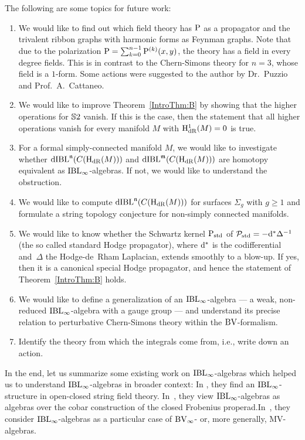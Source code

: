\documentclass[\MainFolder/Text.tex]{subfiles}
\begin{document}
The following are some topics for future work:

\begin{enumerate}[label=(\arabic*)]
\item We would like to find out which field theory has $\mathrm{P}$ as a propagator and the trivalent ribbon graphs with harmonic forms as Feynman graphs. Note that due to the polarization $\mathrm{P} = \sum_{k=0}^{n-1}\mathrm{P}^{(k)}(x,y)$, the theory has a field in every degree fields. This is in contrast to the Chern-Simons theory for $n=3$, whose field is a $1$-form. Some actions were suggested to the author by Dr.~Puzzio and Prof.~A.~Cattaneo.

\item We would like to improve Theorem~\ref{IntroThm:B} by showing that the higher operations for $\mathbb{S}{2}$ vanish. If this is the case,  then the statement that all higher operations vanish for every manifold $M$ with $\mathrm{H}_{\mathrm{dR}}^1(M)=0$ is true.
\item For a formal simply-connected manifold $M$, we would like to investigate whether $\mathrm{dIBL}^{\mathfrak{n}}(C(\mathrm{H}_{\mathrm{dR}}(M)))$ and $\mathrm{dIBL}^{\mathfrak{m}}(C(\mathrm{H}_{\mathrm{dR}}(M)))$ are homotopy equivalent as $\mathrm{IBL}_\infty$-algebras. If not, we would like to understand the obstruction. 
\item We would like to compute $\mathrm{dIBL}^{\mathfrak{n}}(C(\mathrm{H}_{\mathrm{dR}}(M)))$ for surfaces $\Sigma_g$ with $g\ge 1$ and formulate a string topology conjecture for non-simply connected manifolds. 
\item We would like to know whether the Schwartz kernel $\mathrm{P}_{\mathrm{std}}$ of $\mathcal{P}_{\mathrm{std}}=-\mathrm{d}^* \Delta^{-1}$ (the so called standard Hodge propagator), where $\mathrm{d}^*$ is the codifferential and~$\Delta$ the Hodge-de~Rham Laplacian, extends smoothly to a blow-up. If yes, then it is a canonical special Hodge propagator, and hence the statement of Theorem~\ref{IntroThm:B} holds.
\item We would like to define a generalization of an $\mathrm{IBL}_\infty$-algebra --- a weak, non-reduced $\mathrm{IBL}_\infty$-algebra with a gauge group --- and understand its precise relation to perturbative Chern-Simons theory within the $\mathrm{BV}$-formalism.
\item Identify the theory from which the integrals come from, i.e., write down an action.
\end{enumerate}

In the end, let us summarize some existing work on $\mathrm{IBL}_\infty$-algebras which helped us to understand $\mathrm{IBL}_\infty$-algebras in broader context: In \cite{Muenster2011}, they find an $\mathrm{IBL}_\infty$-structure in open-closed string field theory. In~\cite{Doubek2017}, they view $\mathrm{IBL}_\infty$-algebras as algebras over the cobar construction of the closed Frobenius properad.In~\cite{Markl2015}, they consider $\mathrm{IBL}_\infty$-algebras as a particular case of $\mathrm{BV}_\infty$- or,  more generally, $\mathrm{MV}$-algebras.
\end{document}
